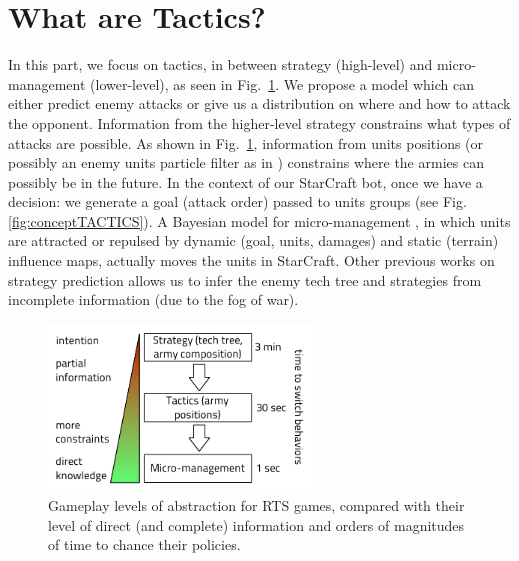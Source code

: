 \section{What are Tactics?}
In this part, we focus on tactics, in between strategy (high-level) and micro-management (lower-level), as seen in Fig.~\ref{fig:sc_abstraction_tactics}. We propose a model which can either predict enemy attacks or give us a distribution on where and how to attack the opponent. Information from the higher-level strategy constrains what types of attacks are possible. As shown in Fig.~\ref{fig:sc_abstraction_tactics}, information from units positions (or possibly an enemy units particle filter as in \cite{weber2011aiide}) constrains where the armies can possibly be in the future. In the context of our StarCraft bot, once we have a decision: we generate a goal (attack order) passed to units groups (see Fig.\ref{fig:conceptTACTICS}). A Bayesian model for micro-management \cite{SYNNAEVE:Micro}, in which units are attracted or repulsed by dynamic (goal, units, damages) and static (terrain) influence maps, actually moves the units in StarCraft. Other previous works on strategy prediction \cite{SYNNAEVE:StratPred,SYNNAEVE:OpeningPred} allows us to infer the enemy tech tree and strategies from incomplete information (due to the fog of war).

\begin{figure}[htp]
\centerline{\includegraphics[width=7cm]{images/starcraft_levels_abstraction_light.pdf}}
\caption{Gameplay levels of abstraction for RTS games, compared with their level of direct (and complete) information and orders of magnitudes of time to chance their policies.}
\label{fig:sc_abstraction_tactics}
\end{figure}

